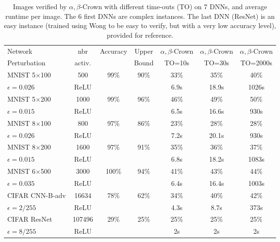 \begin{table}[t!]
	\centering
	\begin{tabular}{||l|c|c|c||c|c|c||}
		\hline
		Network & nbr & Accuracy & Upper  & $\alpha,\beta$-Crown& $\alpha,\beta$-Crown & $\alpha,\beta$-Crown \\ 
		Perturbation & activ. &  & Bound & TO=10s & TO=30s & TO=2000s\\ \hline
		MNIST 5$\times$100 & 500 & 99\% & 90\% & 33\% & 35\% & 40\%   \\
		$\epsilon = 0.026$ & ReLU & &  & 6.9s &  18.9s &  1026s  \\  \hline
		MNIST 5$\times$200 & 1000 & 99\%  & 96\%  & 46\%  & 49\%  & 50\%   \\ 
		$\epsilon = 0.015$ & ReLU & &  & 6.5s &  16.6s &  930s  \\  \hline
		MNIST 8$\times$100 & 800 & 97\%  & 86\%  & 23\%  & 28\%  & 28\%   \\
		$\epsilon = 0.026$ & ReLU &  &  & 7.2s &  20.1s &  930s  \\  \hline
		MNIST 8$\times$200 & 1600 & 97\%  & 91\%  & 35\%  & 36\%  & 37\%   \\ 
		$\epsilon = 0.015$ & ReLU & &  & 6.8s &  18.2s &  1083s  \\  \hline
		MNIST 6$\times$500 & 3000 & 100\%  & 94\%  & 41\%  & 43\%  & 44\%   \\ 
		$\epsilon = 0.035$ & ReLU & &  & 6.4s &  16.4s &  1003s  \\  \hline
		CIFAR CNN-B-adv &  16634  &   78\%  & 62\%  &  34\% & 40\%  & 42\%   \\
		$\epsilon = 2/255$& ReLU &  &  & 4.3s & 8.7s & 373s  \\ \hline \hline
		CIFAR ResNet &   107496  & 29\%  & 25\%  & 25\%  & 25\%  & 25\%   \\
		$\epsilon = 8/255$ & ReLU &  &  & 2s & 2s & 2s  \\ \hline
	\end{tabular}
	\caption{Images verified by $\alpha,\beta$-Crown with different time-outs (TO) on 7 DNNs, and average runtime per image. The 6 first DNNs are complex instances. The last DNN (ResNet) is an easy instance (trained using Wong to be easy to verify, but with a very low accuracy level), provided for reference.
	\vspace{-0.5cm}}
	\label{table_beta}
\end{table}

